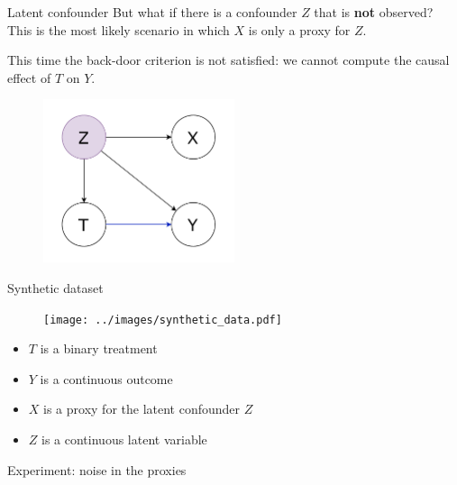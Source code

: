 \documentclass[10pt]{beamer}
\begin{document}
\begin{frame}{Latent confounder}
  But what if there is a confounder $Z$ that is \textbf{not} observed? This is the most likely scenario in which $X$ is only a proxy for $Z$.

  This time the back-door criterion is not satisfied: we cannot compute the causal effect of $T$ on $Y$.

  \begin{figure}
    \centering
    \includegraphics[width=0.5\textwidth]{images/latent.drawio.pdf}
  \end{figure}


\end{frame}

\begin{frame}{Synthetic dataset}
    \begin{minipage}
    [t]{0.5\textwidth}
      \begin{figure}
        \centering
        \texttt{[image: ../images/synthetic\_data.pdf]}
      \end{figure}
    \end{minipage}
    \begin{minipage}
    [t]{0.5\textwidth}
      \begin{itemize}
        \item $T$ is a binary treatment
        \item $Y$ is a continuous outcome
        \item $X$ is a proxy for the latent confounder $Z$
        \item $Z$ is a continuous latent variable
      \end{itemize}
    \end{minipage}
\end{frame}

\begin{frame}{Experiment: noise in the proxies}
    
\end{frame}
\end{document}
